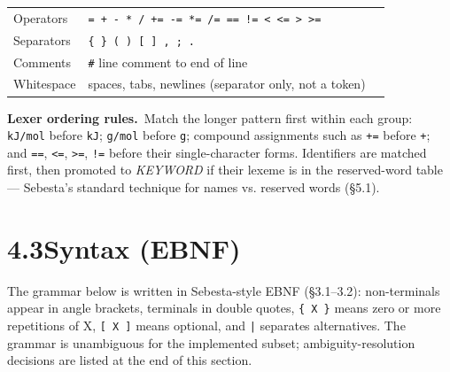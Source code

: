 \documentclass[11pt,a4paper]{article}
\newcommand{\code}[1]{\texttt{#1}}
\begin{document}
{\begin{tabularx}{\linewidth}{@{}>{\RaggedRight\arraybackslash}p{2.7cm}
                                >{\RaggedRight\arraybackslash}p{6.0cm}
                                Y@{}}
Operators
  & \code{=}\, \code{+}\, \code{-}\, \code{*}\, \code{/}\, \code{+=}\, \code{-=}\, \code{*=}\, \code{/=}\, \code{==}\, \code{!=}\, \code{<}\, \code{<=}\, \code{>}\, \code{>=}
  & \rx{==|!=|<=|>=|\textbackslash{}+=|-=|\textbackslash{}*=|/=|=|[+\textbackslash{}-*/<>]}\\
Separators
  & \code{\{}\, \code{\}}\, \code{(}\, \code{)}\, \code{[}\, \code{]}\, \code{,}\, \code{;}\, \code{.}
  & \rx{[\{\}()\textbackslash{}[\textbackslash{}],;.]}\\
Comments
  & \code{\#} line comment to end of line
  & \\
Whitespace
  & spaces, tabs, newlines (separator only, not a token)
  & \\
\bottomrule
\end{tabularx}}
\par\vspace{4pt}

\textbf{Lexer ordering rules.}\, Match the longer pattern first within each
group: \code{kJ/mol} before \code{kJ}; \code{g/mol} before \code{g}; compound
assignments such as \code{+=} before \code{+}; and \code{==}, \code{<=},
\code{>=}, \code{!=} before their single-character forms. Identifiers are
matched first, then promoted to \textit{KEYWORD} if their lexeme is in the
reserved-word table --- Sebesta's standard technique for names vs. reserved
words (\S5.1).

\newpage
\section{4.3\quad Syntax (EBNF)}

The grammar below is written in Sebesta-style EBNF (\S3.1--3.2): non-terminals
appear in angle brackets, terminals in double quotes, \code{\{ X \}} means
zero or more repetitions of X, \code{[ X ]} means optional, and \code{|}
separates alternatives. The grammar is unambiguous for the implemented
subset; ambiguity-resolution decisions are listed at the end of this section.
\end{document}
